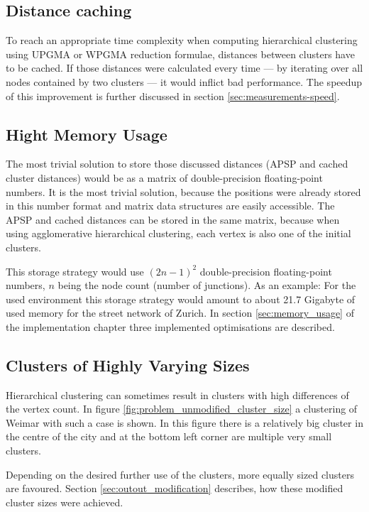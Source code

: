 \subsection{Distance caching} \label{sec:concept_distance_caching}
To reach an appropriate time complexity when computing hierarchical clustering using \acrshort{UPGMA} or \acrshort{WPGMA} reduction formulae, distances between clusters have to be cached. If those distances were calculated every time --- by iterating over all nodes contained by two clusters --- it would inflict bad performance. The speedup of this improvement is further discussed in section \ref{sec:measurements-speed}.

\subsection{Hight Memory Usage} \label{sec:concept_memory_usage}
The most trivial solution to store those discussed distances (\acrshort{APSP} and cached cluster distances) would be as a matrix of double-precision floating-point numbers. It is the most trivial solution, because the positions were already stored in this number format and matrix data structures are easily accessible. The \acrshort{APSP} and cached distances can be stored in the same matrix, because when using agglomerative hierarchical clustering, each vertex is also one of the initial clusters.

This storage strategy would use $(2n-1)^2$ double-precision floating-point numbers, $n$ being the node count (number of junctions). As an example: For the used environment this storage strategy would amount to about 21.7 Gigabyte of used memory for the street network of Zurich. In section \ref{sec:memory_usage} of the implementation chapter three implemented optimisations are described.

\subsection{Clusters of Highly Varying Sizes} \label{sec:concept_cluster_sizes}
Hierarchical clustering can sometimes result in clusters with high differences of the vertex count. In figure \ref{fig:problem_unmodified_cluster_size} a clustering of Weimar with such a case is shown. In this figure there is a relatively big cluster in the centre of the city and at the bottom left corner are multiple very small clusters.

Depending on the desired further use of the clusters, more equally sized clusters are favoured. Section \ref{sec:outout_modification} describes, how these modified cluster sizes were achieved.

